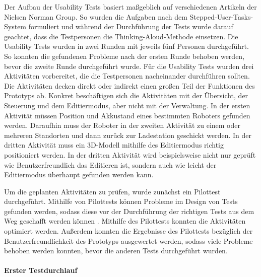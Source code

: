 Der Aufbau der Usability Tests basiert maßgeblich auf verschiedenen Artikeln der Nielsen Norman Group. So wurden die Aufgaben nach dem Stepped-User-Tasks-System \cite{Pernice.2020} formuliert und während der Durchführung der Tests wurde darauf geachtet, dass die Testpersonen die Thinking-Aloud-Methode \cite{Nielsen.2012b} einsetzen. Die Usability Tests wurden in zwei Runden mit jeweils fünf Personen durchgeführt. So konnten die gefundenen Probleme nach der ersten Runde behoben werden, bevor die zweite Runde durchgeführt wurde. Für die Usability Tests wurden drei Aktivitäten vorbereitet, die die Testpersonen nacheinander durchführen sollten. Die Aktivitäten decken direkt oder indirekt einen großen Teil der Funktionen des Prototyps ab. Konkret beschäftigen sich die Aktivitäten mit der Übersicht, der Steuerung und dem Editiermodus, aber nicht mit der Verwaltung. In der ersten Aktivität müssen Position und Akkustand eines bestimmten Roboters gefunden werden. Daraufhin muss der Roboter in der zweiten Aktivität zu einem oder mehreren Standorten und dann zurück zur Ladestation geschickt werden. In der dritten Aktivität muss ein 3D-Modell mithilfe des Editiermodus richtig positioniert werden. In der dritten Aktivität wird beispielsweise nicht nur geprüft wie Benutzerfreundlich das Editieren ist, sondern auch wie leicht der Editiermodus überhaupt gefunden werden kann.

Um die geplanten Aktivitäten zu prüfen, wurde zunächst ein Pilottest durchgeführt. Mithilfe von Pilottests können Probleme im Design von Tests gefunden werden, sodass diese vor der Durchführung der richtigen Tests aus dem Weg geschafft werden können \cite{Schade.2015}. Mithilfe des Pilottests konnten die Aktivitäten optimiert werden. Außerdem konnten die Ergebnisse des Pilottests bezüglich der Benutzerfreundlichkeit des Prototyps ausgewertet werden, sodass viele Probleme behoben werden konnten, bevor die anderen Tests durchgeführt wurden.

\paragraph{Erster Testdurchlauf}

